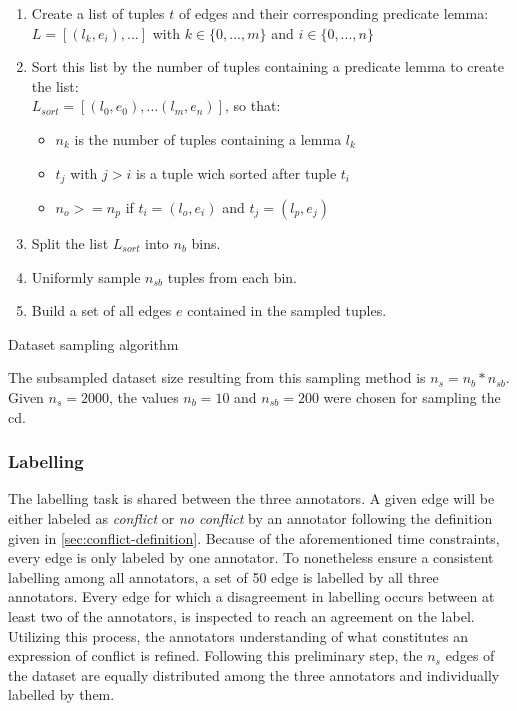 \documentclass[11pt]{scrreprt}
\begin{document}
{\begin{algorithm}
\begin{enumerate}
	\item Create a list of tuples \(t\) of edges and their corresponding predicate lemma: \\ \(L = [(l_k, e_i), ...]\) with \(k \in \{0,...,m\}\) and \(i \in \{0,...,n\}\)
	\item Sort this list by the number of tuples containing a predicate lemma to create the list: \\ \(L_{sort} = [(l_0, e_0), ... (l_m, e_n)]\), so that:
	\begin{itemize}
		\item \(n_k\) is the number of tuples containing a lemma \(l_k\)
		\item \(t_j\) with \(j > i\) is a tuple wich sorted after tuple \(t_i\)
		\item \(n_o >= n_p\) if \(t_i = (l_o, e_i)\) and \(t_j = (l_p, e_j)\)
	\end{itemize}			
	\item Split the list \(L_{sort}\) into \(n_{b}\) bins.
	\item Uniformly sample \(n_{sb}\) tuples from each bin.
	\item Build a set of all edges \(e\) contained in the sampled tuples.
\end{enumerate}
\caption{Dataset sampling algorithm}
\label{algo:dataset-sampling}
\end{algorithm}

The subsampled dataset size resulting from this sampling method is \(n_{s} = n_{b} * n_{sb}\). Given \(n_{s} = 2000\), the values \(n_b = 10\) and \(n_{sb} = 200\) were chosen for sampling the \gls{cd}.


\subsubsection{Labelling}
The labelling task is shared between the three annotators. A given edge will be either labeled as \textit{conflict} or \textit{no conflict} by an annotator following the definition given in \cref{sec:conflict-definition}. Because of the aforementioned time constraints, every edge is only labeled by one annotator. To nonetheless ensure a consistent labelling among all annotators, a set of 50 edge is labelled by all three annotators. Every edge for which a disagreement in labelling occurs between at least two of the annotators, is inspected to reach an agreement on the label. Utilizing this process, the annotators understanding of what constitutes an expression of conflict is refined. Following this preliminary step, the \(n_s\) edges of the dataset are equally distributed among the three annotators and individually labelled by them.

}
\end{document}
